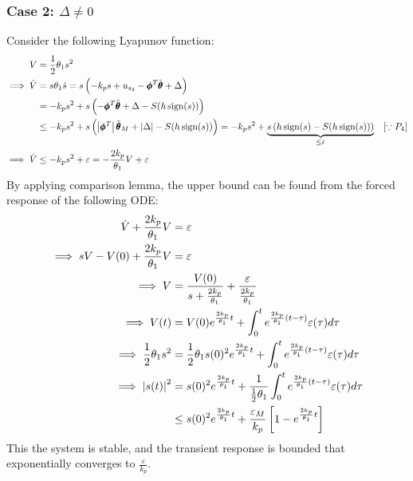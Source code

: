 \subsubsection{Case 2: $\Delta \neq 0$}
Consider the following Lyapunov function:
\begin{align*}
    V &= \frac{1}{2} \theta_1 s^2\\
    \implies \dot V &= s \theta_1 \dot s = s \left( -k_p s + u_{s_2} - \pmb \phi^T \tilde{\pmb \theta} + \Delta  \right)\\
    &= -k_p s^2 + s \left( -\pmb \phi^T \tilde{\pmb \theta} + \Delta - S(h \,\text{sign}(s)) \right)\\
    &\leq -k_p s^2 + s \left( \left\lvert \pmb \phi^T \right\rvert \tilde{\pmb \theta}_M + \left\lvert \Delta \right\rvert - S(h \,\text{sign}(s)) \right)
    = -k_p s^2 + \underbrace{s \left( h\,\text{sign}(s)- S(h \,\text{sign}(s)) \right)}_{\leq \varepsilon} \quad [\because P_4] \\
    \implies \dot V &\leq -k_p s^2 + \varepsilon = - \frac{2 k_p}{\theta_1} V + \varepsilon
\end{align*}
By applying comparison lemma, the upper bound can be found from the forced
response of the following ODE:
\begin{align*}
    \dot V + \frac{2 k_p}{\theta_1} V &= \varepsilon\\
    \implies sV - V(0) + \frac{2 k_p}{\theta_1} V &= \varepsilon\\
    \implies V &= \frac{V(0)}{s + \frac{2 k_p}{\theta_1}} + \frac{\varepsilon}{\frac{2 k_p}{\theta_1}}\\
    \implies V(t) &= V(0)e^{\frac{2 k_p}{\theta_1} t} + \int_0^t{e^{\frac{2 k_p}{\theta_1} (t-\tau)} \varepsilon(\tau) d\tau}\\
    \implies \frac{1}{2} \theta_1 s^2 &= \frac{1}{2} \theta_1 s(0)^2 e^{\frac{2 k_p}{\theta_1} t} + \int_0^t{e^{\frac{2 k_p}{\theta_1} (t-\tau)} \varepsilon(\tau) d\tau}\\
    \implies \left\lvert s(t) \right\rvert^2 &= s(0)^2 e^{\frac{2 k_p}{\theta_1} t} +\frac{1}{\frac{1}{2} \theta_1 } \int_0^t{e^{\frac{2 k_p}{\theta_1} (t-\tau)} \varepsilon(\tau) d\tau}\\
    &\leq s(0)^2 e^{\frac{2 k_p}{\theta_1} t} + \frac{\varepsilon_M}{k_p} \left[1 -  e^{\frac{2 k_p}{\theta_1} t} \right]\\
\end{align*}
This the system is stable, and the transient response is bounded that
exponentially converges to $\frac{\varepsilon}{k_p}$.
